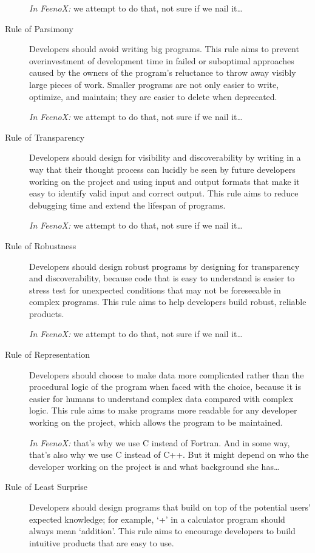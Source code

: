 \documentclass[
  american,
]{article}
\begin{document}
\begin{description}
\emph{In FeenoX:} we attempt to do that, not sure if we nail it\ldots{}
\item[Rule of Parsimony]
Developers should avoid writing big programs. This rule aims to prevent
overinvestment of development time in failed or suboptimal approaches
caused by the owners of the program's reluctance to throw away visibly
large pieces of work. Smaller programs are not only easier to write,
optimize, and maintain; they are easier to delete when deprecated.

\emph{In FeenoX:} we attempt to do that, not sure if we nail it\ldots{}
\item[Rule of Transparency]
Developers should design for visibility and discoverability by writing
in a way that their thought process can lucidly be seen by future
developers working on the project and using input and output formats
that make it easy to identify valid input and correct output. This rule
aims to reduce debugging time and extend the lifespan of programs.

\emph{In FeenoX:} we attempt to do that, not sure if we nail it\ldots{}
\item[Rule of Robustness]
Developers should design robust programs by designing for transparency
and discoverability, because code that is easy to understand is easier
to stress test for unexpected conditions that may not be foreseeable in
complex programs. This rule aims to help developers build robust,
reliable products.

\emph{In FeenoX:} we attempt to do that, not sure if we nail it\ldots{}
\item[Rule of Representation]
Developers should choose to make data more complicated rather than the
procedural logic of the program when faced with the choice, because it
is easier for humans to understand complex data compared with complex
logic. This rule aims to make programs more readable for any developer
working on the project, which allows the program to be maintained.

\emph{In FeenoX:} that's why we use C instead of Fortran. And in some
way, that's also why we use C instead of C++. But it might depend on who
the developer working on the project is and what background she
has\ldots{}
\item[Rule of Least Surprise]
Developers should design programs that build on top of the potential
users' expected knowledge; for example, `+' in a calculator program
should always mean `addition'. This rule aims to encourage developers to
build intuitive products that are easy to use.


\end{description}
\end{document}
